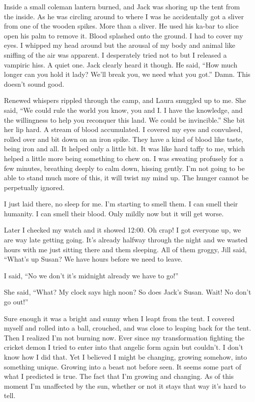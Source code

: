 Inside a small coleman lantern burned, and Jack was shoring up the tent from the inside. As he was circling around to where I was he accidentally got a sliver from one of the wooden spikes. More than a sliver. He used his ka-bar to slice open his palm to remove it. Blood splashed onto the ground. I had to cover my eyes. I whipped my head around but the arousal of my body and animal like sniffing of the air was apparent. I desperately tried not to but I released a vampiric hiss. A quiet one. Jack clearly heard it though. He said, ``How much longer can you hold it lady? We'll break you, we need what you got.'' Damn. This doesn't sound good.

Renewed whispers rippled through the camp, and Laura snuggled up to me. She said, ``We could rule the world you know, you and I. I have the knowledge, and the willingness to help you reconquer this land. We could be invincible.'' She bit her lip hard. A stream of blood accumulated. I covered my eyes and convulsed, rolled over and bit down on an iron spike. They have a kind of blood like taste, being iron and all. It helped only a little bit. It was like hard taffy to me, which helped a little more being something to chew on. I was sweating profusely for a few minutes, breathing deeply to calm down, hissing gently. I'm not going to be able to stand much more of this, it will twist my mind up. The hunger cannot be perpetually ignored.

I just laid there, no sleep for me. I'm starting to smell them. I can smell their humanity. I can smell their blood. Only mildly now but it will get worse.

Later I checked my watch and it showed 12:00. Oh crap! I got everyone up, we are way late getting going. It's already halfway through the night and we wasted hours with me just sitting there and them sleeping. All of them groggy, Jill said, ``What's up Susan? We have hours before we need to leave.

I said, ``No we don't it's midnight already we have to go!''

She said, ``What? My clock says high noon? So does Jack's Susan. Wait! No don't go out!''

Sure enough it was a bright and sunny when I leapt from the tent. I covered myself and rolled into a ball, crouched, and was close to leaping back for the tent. Then I realized I'm not burning now. Ever since my transformation fighting the cricket demon I tried to enter into that angelic form again but couldn't. I don't know how I did that. Yet I believed I might be changing, growing somehow, into something unique. Growing into a beast not before seen. It seems some part of what I predicted is true. The fact that I'm growing and changing. As of this moment I'm unaffected by the sun, whether or not it stays that way it's hard to tell.

